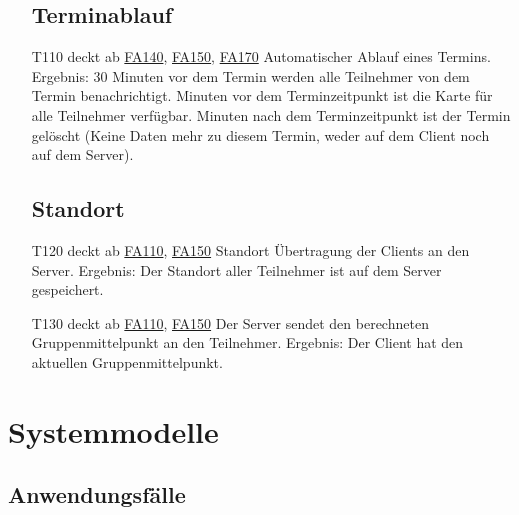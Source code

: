 \documentclass{scrartcl}
\begin{document}
\begin{itemize}
	\subsection{Terminablauf}
	
		\item[T110] deckt ab \hyperlink{FA140}{FA140}, \hyperlink{FA150}{FA150}, \hyperlink{FA170}{FA170} \newline
		Automatischer Ablauf eines Termins. \newline
		Ergebnis: 30 Minuten vor dem Termin werden alle \gls{Teilnehmer} von dem Termin benachrichtigt.   Minuten vor dem Terminzeitpunkt ist die Karte für alle Teilnehmer verfügbar.   Minuten nach dem Terminzeitpunkt ist der Termin gelöscht (Keine Daten mehr zu diesem Termin, weder auf 					dem \gls{Client} noch auf dem \gls{Server}).

	\subsection{Standort}
		\item[T120] deckt ab \hyperlink{FA110}{FA110}, \hyperlink{FA150}{FA150} \newline
		Standort Übertragung der Clients an den \gls{Server}.  \newline
		Ergebnis: Der Standort aller \gls{Teilnehmer} ist auf dem Server gespeichert.

		\item[T130]  deckt ab \hyperlink{FA110}{FA110}, \hyperlink{FA150}{FA150} \newline
		Der \gls{Server} sendet den berechneten Gruppenmittelpunkt an den \gls{Teilnehmer}. \newline
		Ergebnis: Der \gls{Client} hat den aktuellen Gruppenmittelpunkt.

	\end{itemize}	
	
	\newpage
	
	
	\section{Systemmodelle}
	
	\subsection{Anwendungsfälle}
\end{document}
